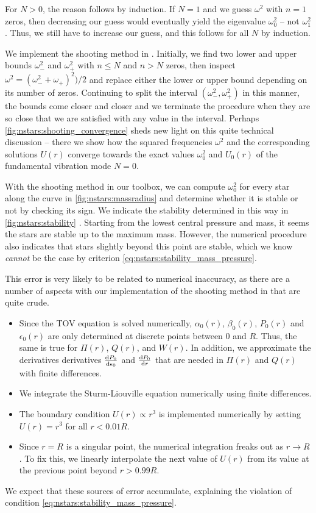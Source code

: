 For $N > 0$, the reason follows by induction.
If $N = 1$ and we guess $\omega^2$ with $n = 1$ zeros, then decreasing our guess would eventually yield the eigenvalue $\omega_0^2$ -- not $\omega_1^2$.
Thus, we still have to increase our guess, and this follows for all $N$ by induction.

We implement the shooting method in .
Initially, we find two lower and upper bounds $\omega_-^2$ and $\omega_+^2$ with $n \leq N$ and $n > N$ zeros, then inspect $\omega^2 = (\omega_-^2 + \omega_+)^2) / 2$ and replace either the lower or upper bound depending on its number of zeros.
Continuing to split the interval $(\omega_-^2, \omega_+^2)$ in this manner, the bounds come closer and closer and we terminate the procedure when they are so close that we are satisfied with any value in the interval.
Perhaps \cref{fig:nstars:shooting_convergence} sheds new light on this quite technical discussion -- there we show how the squared frequencies $\omega^2$ and the corresponding solutions $U(r)$ converge towards the exact values $\omega_0^2$ and $U_0(r)$ of the fundamental vibration mode $N=0$.

With the shooting method in our toolbox, we can compute $\omega_0^2$ for every star along the curve in \cref{fig:nstars:massradius} and determine whether it is stable or not by checking its sign.
We indicate the stability determined in this way in \cref{fig:nstars:stability} .
Starting from the lowest central pressure and mass, it seems the stars are stable up to the maximum mass.
However, the numerical procedure also indicates that stars slightly beyond this point are stable, which we know \emph{cannot} be the case by criterion \eqref{eq:nstars:stability_mass_pressure}.

This error is very likely to be related to numerical inaccuracy, as there are a number of aspects with our implementation of the shooting method in  that are quite crude.
\begin{itemize}
\item Since the TOV equation is solved numerically, $\alpha_0(r)$, $\beta_0(r)$, $P_0(r)$ and $\epsilon_0(r)$ are only determined at discrete points between $0$ and $R$.
      Thus, the same is true for $\Pi(r)$, $Q(r)$, and $W(r)$.
      In addition, we approximate the derivatives derivatives $\odv{P_0}{\epsilon_0}$ and $\odv{P_0}{r}$ that are needed in $\Pi(r)$ and $Q(r)$ with finite differences.
\item We integrate the Sturm-Liouville equation numerically using finite differences.
\item The boundary condition $U(r) \propto r^3$ is implemented numerically by setting $U(r) = r^3$ for all $r < 0.01 R$.
\item Since $r=R$ is a singular point, the numerical integration freaks out as $r \rightarrow R$.
      To fix this, we linearly interpolate the next value of $U(r)$ from its value at the previous point beyond $r > 0.99 R$.
\end{itemize}
We expect that these sources of error accumulate, explaining the violation of condition \eqref{eq:nstars:stability_mass_pressure}.

